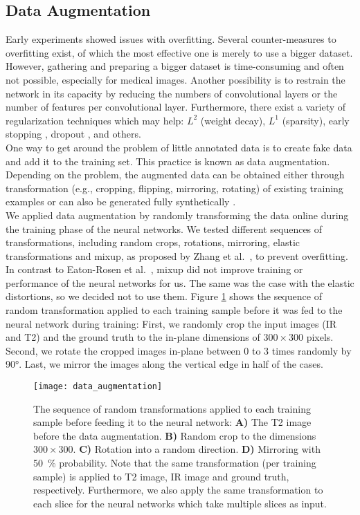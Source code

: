 \subsection{Data Augmentation} \label{sec:trainig:data_augmentation}
Early experiments showed issues with overfitting. Several counter-measures to overfitting exist, of which the most effective one is merely to use a bigger dataset. However, gathering and preparing a bigger dataset is time-consuming and often not possible, especially for medical images. Another possibility is to restrain the network in its capacity by reducing the numbers of convolutional layers or the number of features per convolutional layer.
Furthermore, there exist a variety of regularization techniques which may help:
$L^2$ (weight decay), $L^1$ (sparsity), early stopping \cite{Goodfellow2016DeepLearning}, dropout \cite{Srivastava2014Dropout:Overfitting}, and others.\\
One way to get around the problem of little annotated data is to create fake data and add it to the training set. This practice is known as data augmentation. Depending on the problem, the augmented data can be obtained either through transformation (e.g., cropping, flipping, mirroring, rotating) of existing training examples or can also be generated fully synthetically \cite{Tetteh2018DeepVesselNet:Volumes}.\\
We applied data augmentation by randomly transforming the data online during the training phase of the neural networks. We tested different sequences of transformations, including random crops, rotations, mirroring, elastic transformations and mixup, as proposed by Zhang et al.~\cite{Zhang2017Mixup:Minimization}, to prevent overfitting. In contrast to Eaton-Rosen et al.~\cite{Eaton-rosen2018ImprovingSegmentation}, mixup did not improve training or performance of the neural networks for us. The same was the case with the elastic distortions, so we decided not to use them. Figure \ref{fig:data_augmentation} shows the sequence of random transformation applied to each training sample before it was fed to the neural network during training: First, we randomly crop the input images (IR and T2) and the ground truth to the in-plane dimensions of $300 \times 300$ pixels. Second, we rotate the cropped images in-plane between 0 to 3 times randomly by 90\si{\degree}. Last, we mirror the images along the vertical edge in half of the cases.

\begin{figure}[htbp]	
	\texttt{[image: data\_augmentation]}
    \caption[Data Augmentation]{The sequence of random transformations applied to each training sample before feeding it to the neural network: \textbf{A)} The T2 image  before the data augmentation. \textbf{B)} Random crop to the dimensions $300 \times 300$. \textbf{C)} Rotation into a random direction. \textbf{D)} Mirroring with 50~\% probability. Note that the same transformation (per training sample) is applied to T2 image, IR image and ground truth, respectively. Furthermore, we also apply the same transformation to each slice for the neural networks which take multiple slices as input. }
    \label{fig:data_augmentation}
\end{figure}

